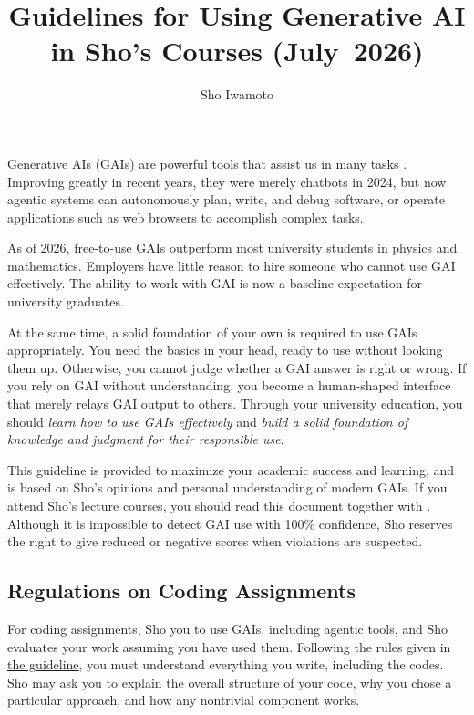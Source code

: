 \documentclass[11pt,pdfa,lastpage,minititle]{MishoNote}
\title{Guidelines for Using Generative AI in Sho's Courses (July~2026)}
\author{Sho Iwamoto}
\begin{document}
\maketitle
Generative AIs (GAIs) are powerful tools that assist us in many tasks%
%
.
Improving greatly in recent years, they were merely chatbots in 2024, but now agentic systems can autonomously plan, write, and debug software, or operate applications such as web browsers to accomplish complex tasks.

As of 2026, free-to-use GAIs outperform most university students in physics and mathematics.
Employers have little reason to hire someone who cannot use GAI effectively.
The ability to work with GAI is now a baseline expectation for university graduates.

At the same time, a solid foundation of your own is required to use GAIs appropriately.
You need the basics in your head, ready to use without looking them up.
Otherwise, you cannot judge whether a GAI answer is right or wrong.
If you rely on GAI without understanding, you become a human-shaped interface that merely relays GAI output to others.
Through your university education, you should \emph{learn how to use GAIs effectively} and \emph{build a solid foundation of knowledge and judgment for their responsible use}.

\bigskip

This guideline is provided to maximize your academic success and learning, and is based on Sho's opinions and personal understanding of modern GAIs.
If you attend Sho's lecture courses, you should read this document together with .
Although it is impossible to detect GAI use with 100\% confidence, Sho reserves the right to give reduced or negative scores when violations are suspected.

\OutputNote

\subsection*{Regulations on Coding Assignments}
For coding assignments, Sho  you to use GAIs, including agentic tools, and Sho evaluates your work assuming you have used them.
Following the rules given in \href{https://misho104.github.io/LecturePublic/submission_guideline.pdf}{the guideline}, you must understand everything you write, including the codes.
Sho may ask you to explain the overall structure of your code, why you chose a particular approach, and how any nontrivial component works.
\end{document}
